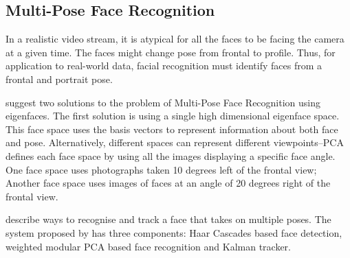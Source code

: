 \subsection{Multi-Pose Face Recognition}
  In a realistic video stream, it is atypical for all the faces to be facing the camera at a given time.
  The faces might change pose from frontal to profile.
  Thus, for application to real-world data, facial recognition must identify faces from a frontal and portrait pose.

  \citet{viewBasedFaceRecog} suggest two solutions to the problem of Multi-Pose Face Recognition using eigenfaces.
  The first solution is using a single high dimensional eigenface space.
  This face space uses the basis vectors to represent information about both face and pose.
  Alternatively, different spaces can represent different viewpoints--PCA defines each face space by using all the images displaying a specific face angle.
  One face space uses photographs taken 10 degrees left of the frontal view; Another face space uses images of faces at an angle of 20 degrees right of the frontal view.

  \citet{PoseFaceRec} describe ways to recognise and track a face that takes on multiple poses.
  The system proposed by \citet{PoseFaceRec} has three components: Haar Cascades based face detection, weighted modular PCA based face recognition and Kalman tracker.
